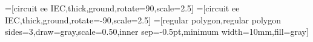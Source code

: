 
=[circuit ee IEC,thick,ground,rotate=90,scale=2.5]
=[circuit ee IEC,thick,ground,rotate=-90,scale=2.5]
=[regular polygon,regular polygon sides=3,draw=gray,scale=0.50,inner sep=-0.5pt,minimum width=10mm,fill=gray]
